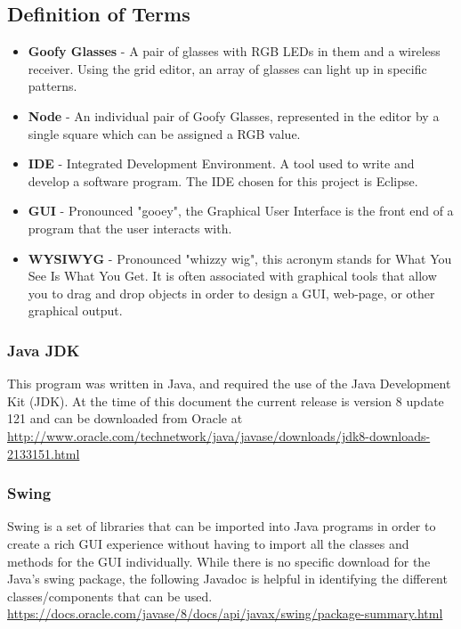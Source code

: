 \documentclass[12pt]{article}
\begin{document}
		\subsection{Definition of Terms}
		\begin{itemize}
      \item \textbf{Goofy Glasses} - A pair of glasses with RGB LEDs in them and a wireless receiver. Using the grid editor, an array of glasses can light up in specific patterns.
			\item \textbf{Node} - An individual pair of Goofy Glasses, represented in the editor by a single square which can be assigned a RGB value.
			\item \textbf{IDE} - Integrated Development Environment. A tool used to write and develop a software program. The IDE chosen for this project is Eclipse.
			\item \textbf{GUI} - Pronounced "gooey", the Graphical User Interface is the front end of a program that the user interacts with.
			\item \textbf{WYSIWYG} - Pronounced "whizzy wig", this acronym stands for What You See Is What You Get. It is often associated with graphical tools that allow you to drag and drop objects in order to design a GUI, web-page, or other graphical output. 			
		\end{itemize}
		
		\subsubsection{Java JDK}
  		This program was written in Java, and required the use of the Java Development Kit (JDK). At the time of this document the current release is version 8 update 121 and can be downloaded from Oracle at \url{http://www.oracle.com/technetwork/java/javase/downloads/jdk8-downloads-2133151.html}
		
		\subsubsection{Swing}
  		Swing is a set of libraries that can be imported into Java programs in order to create a rich GUI experience without having to import all the classes and methods for the GUI individually. While there is no specific download for the Java's swing package, the following Javadoc is helpful in identifying the different classes/components that can be used. \url{https://docs.oracle.com/javase/8/docs/api/javax/swing/package-summary.html}
		
\end{document}
